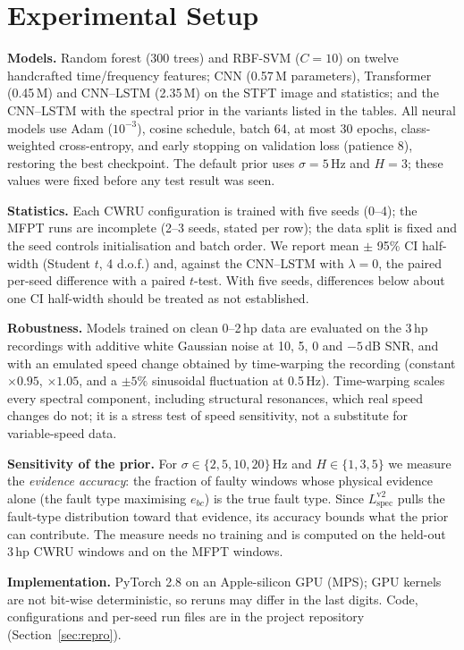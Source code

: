 \documentclass[conference]{IEEEtran}
\newcommand{\Lspec}{L_{\mathrm{spec}}}
\begin{document}
\section{Experimental Setup}
\textbf{Models.} Random forest (300 trees) and RBF-SVM ($C=10$) on twelve
handcrafted time/frequency features; CNN (0.57\,M parameters), Transformer
(0.45\,M) and CNN--LSTM (2.35\,M) on the STFT image and statistics; and the
CNN--LSTM with the spectral prior in the variants listed in the tables. All
neural models use Adam ($10^{-3}$), cosine schedule, batch 64, at most 30
epochs, class-weighted cross-entropy, and early stopping on validation loss
(patience 8), restoring the best checkpoint. The default prior uses $\sigma=5$\,Hz
and $H=3$; these values were fixed before any test result was seen.

\textbf{Statistics.} Each CWRU configuration is trained with five seeds (0--4);
the MFPT runs are incomplete (2--3 seeds, stated per row);
the data split is fixed and the seed controls initialisation and batch order.
We report mean $\pm$ 95\% CI half-width (Student $t$, 4 d.o.f.) and, against the
CNN--LSTM with $\lambda=0$, the paired per-seed difference with a paired
$t$-test. With five seeds, differences below about one CI half-width should be
treated as not established.

\textbf{Robustness.} Models trained on clean 0--2\,hp data are evaluated on
the 3\,hp recordings with additive white Gaussian noise at 10, 5, 0 and
$-5$\,dB SNR, and with an emulated speed change obtained by time-warping the
recording (constant $\times0.95$, $\times1.05$, and a $\pm5\%$ sinusoidal
fluctuation at 0.5\,Hz). Time-warping scales every spectral component,
including structural resonances, which real speed changes do not; it is a
stress test of speed sensitivity, not a substitute for variable-speed data.

\textbf{Sensitivity of the prior.} For $\sigma\in\{2,5,10,20\}$\,Hz and
$H\in\{1,3,5\}$ we measure the \emph{evidence accuracy}: the fraction of
faulty windows whose physical evidence alone (the fault type maximising
$e_{bc}$) is the true fault type. Since $\Lspec^{\mathrm{v2}}$ pulls the
fault-type distribution toward that evidence, its accuracy bounds what the
prior can contribute. The measure needs no training and is computed on the
held-out 3\,hp CWRU windows and on the MFPT windows.

\textbf{Implementation.} PyTorch 2.8 on an Apple-silicon GPU (MPS); GPU
kernels are not bit-wise deterministic, so reruns may differ in the last
digits. Code, configurations and per-seed run files are in the project
repository (Section~\ref{sec:repro}).
\end{document}
